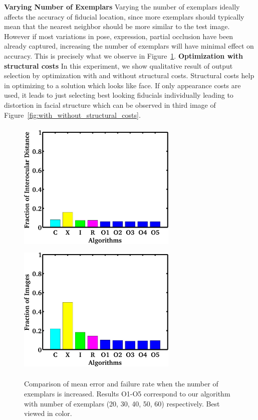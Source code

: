 % 
\textbf{Varying Number of Exemplars}
\label{subsec:varying_number_of_exemplars}
Varying the number of exemplars ideally affects the accuracy of fiducial location, since
more exemplars should typically mean that the nearest neighbor
 should be more similar to the test image. However if most
variations in pose, expression, partial occlusion have been already captured, increasing the number
of exemplars will have minimal effect on accuracy. This is precisely what we observe in
Figure~\ref{fig:num_exemplars}.
\textbf{Optimization with structural costs}
\label{subsec:with_without_structural_costs}
In this experiment, we show qualitative result of output selection by optimization with and without
structural costs. Structural costs help in optimizing to a solution which looks like face. If only
appearance costs are used, it leads to just selecting best looking fiducials individually leading to distortion in facial structure which can be observed in third image of Figure~\ref{fig:with_without_structural_costs}.

\begin{figure}
  \centering
  \includegraphics[width=3.0in,height=2.5in]{fid/figures/iccv_version_one/cofw/num_of_exemplars/mean_err_modified.jpg}
  \includegraphics[width=3.0in,height=2.5in]{fid/figures/iccv_version_one/cofw/num_of_exemplars/fail_rate_modified.jpg}
  \caption{ Comparison of mean error and failure rate when the number of exemplars is increased.
  Results O1-O5 correspond to our algorithm with number of exemplars (20, 30, 40, 50, 60)
  respectively.
  Best viewed in color. }
  \label{fig:num_exemplars}
\end{figure}

